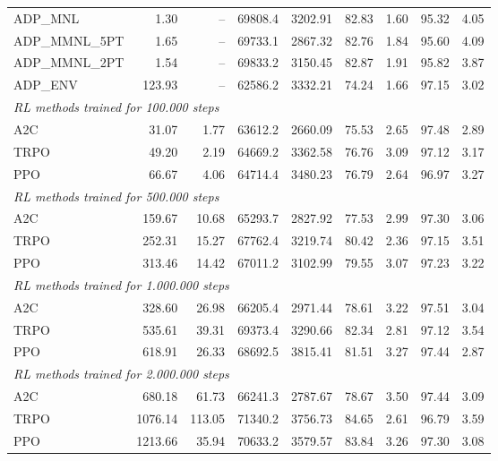 \begin{samepage}
\begin{center}
\begin{tabular}{l|rr|rr|rr|rr}
    \midrule
    ADP\_MNL     &     1.30 &    -- &    69808.4 &    3202.91 &   82.83 &    1.60 &   95.32 &    4.05 \\
    ADP\_MMNL\_5PT &     1.65 &    -- &    69733.1 &    2867.32 &   82.76 &    1.84 &   95.60 &    4.09 \\
    ADP\_MMNL\_2PT &     1.54 &    -- &    69833.2 &    3150.45 &   82.87 &    1.91 &   95.82 &    3.87 \\
    ADP\_ENV     &   123.93 &    -- &    62586.2 &    3332.21 &   74.24 &    1.66 &   97.15 &    3.02 \\
    \midrule
    \multicolumn{9}{l}{\textit{RL methods trained for 100.000 steps}} \\
    \midrule
    A2C          &    31.07 &     1.77 &    63612.2 &    2660.09 &   75.53 &    2.65 &   97.48 &    2.89 \\
    TRPO         &    49.20 &     2.19 &    64669.2 &    3362.58 &   76.76 &    3.09 &   97.12 &    3.17 \\
    PPO          &    66.67 &     4.06 &    64714.4 &    3480.23 &   76.79 &    2.64 &   96.97 &    3.27 \\
    \midrule
    \multicolumn{9}{l}{\textit{RL methods trained for 500.000 steps}} \\
    \midrule
    A2C          &   159.67 &    10.68 &    65293.7 &    2827.92 &   77.53 &    2.99 &   97.30 &    3.06 \\
    TRPO         &   252.31 &    15.27 &    67762.4 &    3219.74 &   80.42 &    2.36 &   97.15 &    3.51 \\
    PPO          &   313.46 &    14.42 &    67011.2 &    3102.99 &   79.55 &    3.07 &   97.23 &    3.22 \\
    \midrule
    \multicolumn{9}{l}{\textit{RL methods trained for 1.000.000 steps}} \\
    \midrule
    A2C          &   328.60 &    26.98 &    66205.4 &    2971.44 &   78.61 &    3.22 &   97.51 &    3.04 \\
    TRPO         &   535.61 &    39.31 &    69373.4 &    3290.66 &   82.34 &    2.81 &   97.12 &    3.54 \\
    PPO          &   618.91 &    26.33 &    68692.5 &    3815.41 &   81.51 &    3.27 &   97.44 &    2.87 \\
    \midrule
    \multicolumn{9}{l}{\textit{RL methods trained for 2.000.000 steps}} \\
    \midrule
    A2C          &   680.18 &    61.73 &    66241.3 &    2787.67 &   78.67 &    3.50 &   97.44 &    3.09 \\
    TRPO         &  1076.14 &   113.05 &    71340.2 &    3756.73 &   84.65 &    2.61 &   96.79 &    3.59 \\
    PPO          &  1213.66 &    35.94 &    70633.2 &    3579.57 &   83.84 &    3.26 &   97.30 &    3.08 \\
    \bottomrule
  \end{tabular}
\end{center}
\end{samepage}

